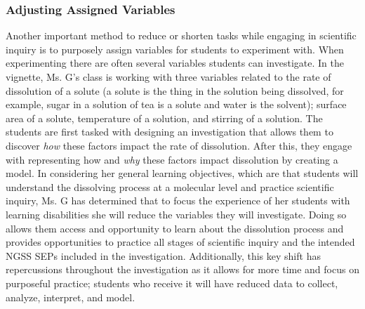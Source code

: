 \documentclass[11pt]{sig-alternate}
\begin{document}
\begin{large}
\subsubsection*{Adjusting Assigned Variables}
Another important method to reduce or shorten tasks while engaging in scientific inquiry is to purposely assign variables for students to experiment with. When experimenting there are often several variables students can investigate. In the vignette, Ms. G’s class is working with three variables related to the rate of dissolution of a solute (a solute is the thing in the solution being dissolved, for example, sugar in a solution of tea is a solute and water is the solvent); surface area of a solute, temperature of a solution, and stirring of a solution. The students are first tasked with designing an investigation that allows them to discover \textit{how} these factors impact the rate of dissolution. After this, they engage with representing how and \textit{why} these factors impact dissolution by creating a model. In considering her general learning objectives, which are that students will understand the dissolving process at a molecular level and practice scientific inquiry, Ms. G has determined that to focus the experience of her students with learning disabilities she will reduce the variables they will investigate. Doing so allows them access and opportunity to learn about the dissolution process and provides opportunities to practice all stages of scientific inquiry and the intended NGSS SEPs included in the investigation. Additionally, this key shift has repercussions throughout the investigation as it allows for more time and focus on purposeful practice; students who receive it will have reduced data to collect, analyze, interpret, and model.


\end{large}
\end{document}
